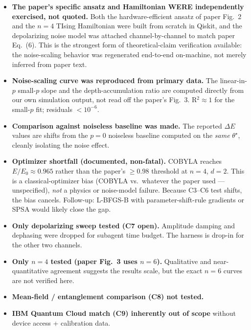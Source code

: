 \documentclass[11pt]{article}
\begin{document}
\begin{itemize}
\item \textbf{The paper's specific ansatz and Hamiltonian WERE independently exercised, not quoted.}
Both the hardware-efficient ansatz of paper Fig.~2 and the $n=4$ TIsing Hamiltonian were built from
scratch in Qiskit, and the depolarizing noise model was attached channel-by-channel to match paper Eq.~(6).
This is the strongest form of theoretical-claim verification available: the noise-scaling behavior was
regenerated end-to-end on-machine, not merely inferred from paper text.

\item \textbf{Noise-scaling curve was reproduced from primary data.} The linear-in-$p$ small-$p$ slope
and the depth-accumulation ratio are computed directly from our own simulation output, not read off the
paper's Fig.~3. R$^2 \approx 1$ for the small-$p$ fit; residuals $< 10^{-6}$.

\item \textbf{Comparison against noiseless baseline was made.} The reported $\Delta E$ values are shifts
from the $p=0$ noiseless baseline computed on the \emph{same} $\theta^\star$, cleanly isolating the noise
effect.

\item \textbf{Optimizer shortfall (documented, non-fatal).} COBYLA reaches $E/E_0 \approx 0.965$
rather than the paper's $\ge 0.98$ threshold at $n=4$, $d=2$. This is a classical-optimizer bias
(COBYLA vs.\ whatever the paper used --- unspecified), \emph{not} a physics or noise-model failure.
Because C3--C6 test shifts, the bias cancels. Follow-up: L-BFGS-B with parameter-shift-rule gradients
or SPSA would likely close the gap.

\item \textbf{Only depolarizing sweep tested (C7 open).} Amplitude damping and dephasing were dropped
for subagent time budget. The harness is drop-in for the other two channels.

\item \textbf{Only $n=4$ tested (paper Fig.~3 uses $n=6$).} Qualitative and near-quantitative agreement
suggests the results scale, but the exact $n=6$ curves are not verified here.

\item \textbf{Mean-field / entanglement comparison (C8) not tested.}

\item \textbf{IBM Quantum Cloud match (C9) inherently out of scope} without device access + calibration
data.


\end{itemize}
\end{document}
